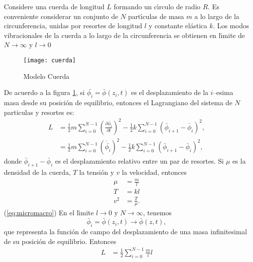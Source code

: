 \begin{frame}
Considere una cuerda de longitud $L$ formando un c\'\i rculo de radio $R$.
Es conveniente considerar un conjunto de $N$ part\'\i culas de masa $m$ a
lo largo de la circunferencia, unidas por resortes de longitud $l$ y
constante el\'astica $k$. Los modos vibracionales de la cuerda a lo
largo de la circunferencia se obtienen en l\'\i mite de $N\to\infty$ y $l\to0$ 

\begin{figure} %
  \centering %
  \texttt{[image: cuerda]} %
  \caption{Modelo Cuerda} %
  \label{fig:1string} %
\end{figure} %
De acuerdo a la figura 
\ref{fig:1string}, %
si $\bar{\phi_i}=\bar{\phi}(z_i,t)$ es el
desplazamiento de la $i$--esima masa desde su posici\'on de equilibrio,
entonces el Lagrangiano del sistema de $N$ particulas y resortes es:
\begin{align}
  \label{eq:1strLsum} %
  L&=\frac{1}{2}m\sum_{i=0}^{N-1}
  \left(
\frac{\partial\bar\phi_i}{\partial t}
  \right)^2-\frac{1}{2}k\sum_{i=0}^{N-1}
  \left(
\bar\phi_{i+1}-\bar\phi_{i}
  \right)^2,\\
  \label{eq:1strLsumdot} 
&=\frac{1}{2}m\sum_{i=0}^{N-1}
  \left(
    \dot{\bar{\phi_i}}
  \right)^2-\frac{1}{2}k\sum_{i=0}^{N-1}
  \left(
\bar\phi_{i+1}-\bar\phi_{i}
  \right)^2,
\end{align}
donde $\bar\phi_{i+1}-\bar\phi_{i}$ es el desplazamiento relativo entre un par de resortes.
Si $\mu$ es la densidad de la cuerda, $T$ la tensi\'on y $v$ la velocidad, entonces
\begin{align}
  \label{eq:micromacro}
  \mu&=\frac{m}{l}\nonumber\\
  T&=kl\\
  v^2&=\frac{T}{\mu}.\nonumber
\end{align}
(\ref{eq:micromacro})
En el l\'\i mite $l\to0$ y $N\to\infty$, tenemos
\begin{equation}
  \label{eq:barf}
  \bar\phi_i=\bar\phi(z_i,t)\to\bar\phi(z,t),
\end{equation}
que representa la funci\'on de campo del desplazamiento de una masa
infinitesimal de su posici\'on de equilibrio. Entonces
\begin{align}
L&=\frac{1}{2}\sum_{i=0}^{N-1}\frac{m}{l}l

\end{align}
\end{frame}

